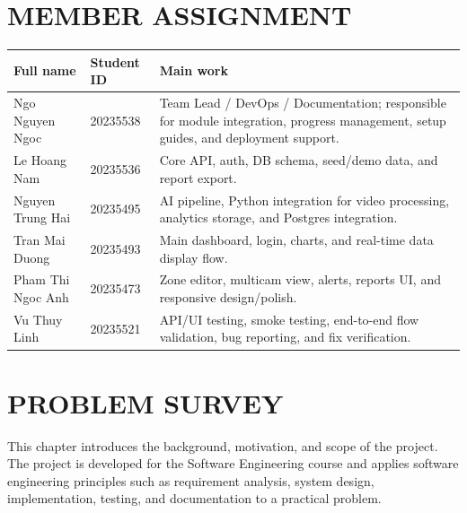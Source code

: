 \documentclass[12pt,a4paper]{report}
\begin{document}
\tableofcontents
\newpage

\chapter*{MEMBER ASSIGNMENT}

\begin{longtable}{|p{3.4cm}|p{3.6cm}|p{5.3cm}|}
\hline
\rowcolor{HeaderBlue}
\textbf{Full name} & \textbf{Student ID} & \textbf{Main work} \\
\hline
Ngo Nguyen Ngoc & 20235538 & Team Lead / DevOps / Documentation; responsible for module integration, progress management, setup guides, and deployment support.\\
\hline
Le Hoang Nam & 20235536 & Core API, auth, DB schema, seed/demo data, and report export. \\
\hline
Nguyen Trung Hai & 20235495 & AI pipeline, Python integration for video processing, analytics storage, and Postgres integration.\\
\hline
Tran Mai Duong & 20235493 & Main dashboard, login, charts, and real-time data display flow. \\
\hline
Pham Thi Ngoc Anh & 20235473 &  Zone editor, multicam view, alerts, reports UI, and responsive design/polish. \\
\hline
Vu Thuy Linh & 20235521 & API/UI testing, smoke testing, end-to-end flow validation, bug reporting, and fix verification. \\
\hline
\end{longtable}

\newpage
{}

\chapter{PROBLEM SURVEY}
\label{chap:project-overview}

This chapter introduces the background, motivation, and scope of the project. The project is developed for the Software Engineering course and applies software engineering principles such as requirement analysis, system design, implementation, testing, and documentation to a practical problem.
\end{document}
